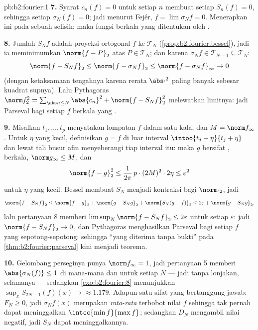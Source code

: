 \begin{solution}{pb:b2:fourier:1}
\textbf{7.} Syarat $c_n(f) = 0$ untuk setiap $n$ membuat setiap $S_n(f) = 0$,
sehingga setiap $\sigma_N(f) = 0$; jadi menurut Fejér, $f = \lim\sigma_Nf =
0$. Menerapkan ini pada sebuah selisih: maka fungsi berkala yang
 ditentukan oleh .

\textbf{8.} Jumlah $S_Nf$ adalah proyeksi ortogonal $f$ ke
$\mathcal T_N$ (\cref{prop:b2:fourier:bessel}), jadi ia meminimumkan
$\norm{f - P}_2$ atas $P \in \mathcal T_N$; dan karena $\sigma_Nf
\in \mathcal T_{N-1} \subseteq \mathcal T_N$:
\[
\norm{f - S_Nf}_2 \leq \norm{f - \sigma_Nf}_2
\leq \norm{f - \sigma_Nf}_\infty \to 0
\]
(dengan ketaksamaan tengahnya karena rerata $\abs\cdot^2$ paling
banyak sebesar kuadrat supnya). Lalu Pythagoras $\norm f_2^2 = \sum_{\abs
n\leq N}\abs{c_n}^2 + \norm{f - S_Nf}_2^2$ melewatkan
limitnya: jadi Parseval bagi setiap $f$ berkala yang .

\textbf{9.} Misalkan $t_1, \dots, t_p$ menyatakan lompatan $f$ dalam satu
kala, dan $M = \norm f_\infty$. Untuk $\eta$ yang kecil, definisikan $g = f$
di luar interval $\intoo{t_j - \eta}{t_j + \eta}$ dan lewat
tali busur afin menyeberangi tiap interval itu: maka $g$ bersifat ,
berkala, $\norm g_\infty \leq M$, dan
\[
\norm{f - g}_2^2 \leq \frac{1}{2\pi}\,p\cdot(2M)^2\cdot2\eta
\leq \varepsilon^2
\]
untuk $\eta$ yang kecil. Bessel membuat $S_N$ menjadi kontraksi bagi
$\norm\cdot_2$, jadi
\[
\norm{f - S_Nf}_2
\leq \norm{f - g}_2 + \norm{g - S_Ng}_2 + \norm{S_N(g -
f)}_2
\leq 2\varepsilon + \norm{g - S_Ng}_2 ,
\]
lalu pertanyaan 8 memberi $\limsup_N\norm{f - S_Nf}_2 \leq
2\varepsilon$ untuk setiap $\varepsilon$: jadi $\norm{f - S_Nf}_2 \to
0$, dan Pythagoras menghasilkan Parseval bagi setiap $f$ yang
 sepotong-sepotong: sehingga ``yang diterima tanpa bukti'' pada
\cref{thm:b2:fourier:parseval} kini menjadi teorema.

\textbf{10.} Gelombang perseginya punya $\norm f_\infty = 1$, jadi
pertanyaan 5 memberi $\abs{\sigma_N(f)} \leq 1$ di mana-mana dan untuk
setiap $N$ --- jadi tanpa lonjakan, selamanya --- sedangkan
\cref{exo:b2:fourier:8} menunjukkan $\sup_xS_{2N-1}(f)(x) \to
\approx 1.179$. Adapun satu sifat yang bertanggung jawab: $F_N \geq 0$, jadi
$\sigma_Nf(x)$ merupakan \emph{rata-rata} terbobot nilai $f$
sehingga tak pernah dapat meninggalkan $\intcc{\min f}{\max f}$; sedangkan $D_N$ mengambil
nilai negatif, jadi $S_N$ dapat meninggalkannya.


\end{solution}
